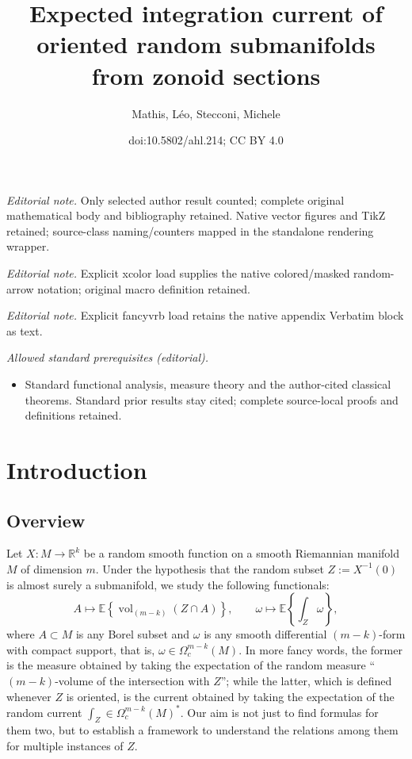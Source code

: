 \documentclass[10pt]{amsart}
\title{Expected integration current of oriented random submanifolds from zonoid sections}
\author{Mathis, Léo, Stecconi, Michele}
\date{doi:10.5802/ahl.214; CC BY 4.0}
\theoremstyle{definition}\newtheorem{defi}[theo]{Definition}\newtheorem{rema}[theo]{Remark}\newtheorem{exam}[theo]{Example}\newtheorem{exem}[theo]{Example}\newtheorem{nota}[theo]{Notation}
\newcommand{\R}{\mathbb{R}}
\newcommand{\EE}{\mathbb{E}}
\DeclareMathOperator{\vol}{vol}
\begin{document}
\maketitle
\noindent\textit{Editorial note.} Only selected author result counted; complete original mathematical body and bibliography retained. Native vector figures and TikZ retained; source-class naming/counters mapped in the standalone rendering wrapper.\par\medskip
\noindent\textit{Editorial note.} Explicit xcolor load supplies the native colored/masked random-arrow notation; original macro definition retained.\par\medskip
\noindent\textit{Editorial note.} Explicit fancyvrb load retains the native appendix Verbatim block as text.\par\medskip
\noindent\textit{Allowed standard prerequisites (editorial).}\begin{itemize}
\item Standard functional analysis, measure theory and the author-cited classical theorems. Standard prior results stay cited; complete source-local proofs and definitions retained.
\end{itemize}\medskip

\section{Introduction}\label{sec:intro}
\subsection{Overview}

Let $X\colon M\to \R^k$ be a random smooth function on a smooth Riemannian manifold $M$ of dimension $m$. Under the hypothesis that the random subset $Z:=X^{-1}(0)$ is almost surely a submanifold, we study the following functionals:
\begin{equation}\label{eq:rhoalpha1}
A\mapsto\EE\left\{\vol_{(m-k)}(Z\cap A)\right\}, \qquad \omega\mapsto \EE\left\{\int_{Z} \omega\right\},
\end{equation}
where $A\subset M$ is any Borel subset and $\omega$ is any smooth differential $(m-k)$-form with compact support, that is, $\omega\in \Omega_c^{m-k}(M)$. In more fancy words, the former is the measure obtained by taking the expectation of the random measure ``$(m-k)$-volume of the intersection with $Z$''; while the latter, which is defined whenever $Z$ is oriented, is the current obtained by taking the expectation of the random current $\int_Z\in \Omega_c^{m-k}(M)^*$. Our aim is not just to find formulas for them two, but to establish a framework to understand the relations among them for multiple instances of $Z$.
\end{document}

